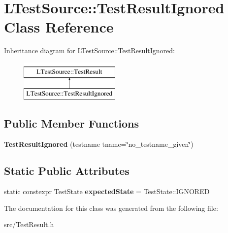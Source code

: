 \hypertarget{class_l_test_source_1_1_test_result_ignored}{\section{L\-Test\-Source\-:\-:Test\-Result\-Ignored Class Reference}
\label{class_l_test_source_1_1_test_result_ignored}
}
Inheritance diagram for L\-Test\-Source\-:\-:Test\-Result\-Ignored\-:\begin{figure}[H]
\begin{center}
\leavevmode
\includegraphics[height=2.000000cm]{class_l_test_source_1_1_test_result_ignored}
\end{center}
\end{figure}
\subsection*{Public Member Functions}
\begin{DoxyCompactItemize}
\item 
\hypertarget{class_l_test_source_1_1_test_result_ignored_acb629e480d9a6ce8bab79bab6b2ea1c7}{{\bfseries Test\-Result\-Ignored} (testname tname=\char`\"{}no\-\_\-testname\-\_\-given\char`\"{})}\label{class_l_test_source_1_1_test_result_ignored_acb629e480d9a6ce8bab79bab6b2ea1c7}

\end{DoxyCompactItemize}
\subsection*{Static Public Attributes}
\begin{DoxyCompactItemize}
\item 
\hypertarget{class_l_test_source_1_1_test_result_ignored_aee784349cec34bff528465fcbf8d8eb2}{static constexpr Test\-State {\bfseries expected\-State} = Test\-State\-::\-I\-G\-N\-O\-R\-E\-D}\label{class_l_test_source_1_1_test_result_ignored_aee784349cec34bff528465fcbf8d8eb2}

\end{DoxyCompactItemize}


The documentation for this class was generated from the following file\-:\begin{DoxyCompactItemize}
\item 
src/Test\-Result.\-h\end{DoxyCompactItemize}
